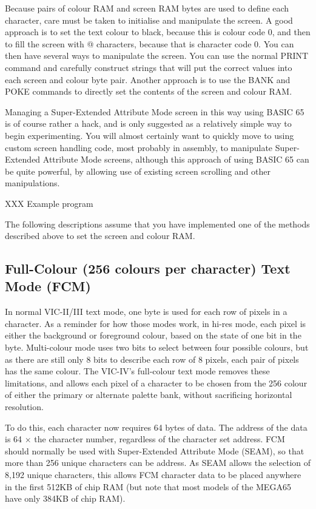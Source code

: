 Because pairs of colour RAM and screen RAM bytes are used to define each character, care must be taken to initialise and manipulate the screen.
A good approach is to set the text colour to black, because this is colour code 0, and then to fill the screen with @ characters, because that is
character code 0.  You can then have several ways to manipulate the screen.  You can use the normal PRINT command and carefully construct
strings that will put the correct values into each screen and colour byte pair. Another approach is to use the BANK and POKE commands to directly set the contents of the screen and colour RAM.

Managing a Super-Extended Attribute Mode screen in this way using BASIC 65 is of course rather a hack, and is only suggested as a relatively simple way to begin experimenting.  You will almost certainly want to quickly move to using custom screen handling code, most probably in assembly, to manipulate Super-Extended Attribute Mode screens, although this approach of using BASIC 65 can be quite powerful, by allowing use of existing screen scrolling and other manipulations.

XXX Example program

The following descriptions assume that you have implemented one of the methods described above to set the screen and colour RAM.

\subsection{Full-Colour (256 colours per character) Text Mode (FCM)}

In normal VIC-II/III text mode, one byte is used for each row of pixels in a character.  As a reminder for how those modes work, in
hi-res mode, each pixel is either the background or foreground colour, based on the state of one bit in the byte.  Multi-colour mode
uses two bits to select between four possible colours, but as there are still only 8 bits to describe each row of 8 pixels, each pair
of pixels has the same colour. The VIC-IV's full-colour text mode removes these limitations, and allows each pixel of a character to
be chosen from the 256 colour of either the primary or alternate palette bank, without sacrificing horizontal resolution.

To do this, each character now requires 64 bytes of data. The address of the data is 64 $\times$ the character number, regardless
of the character set address.
FCM should
normally be used with Super-Extended Attribute Mode (SEAM), so that more than 256 unique characters can be address. As SEAM allows
the selection of 8,192 unique characters, this allows FCM character data to be placed anywhere in the first 512KB of chip RAM (but
note that most models of the MEGA65 have only 384KB of chip RAM).

